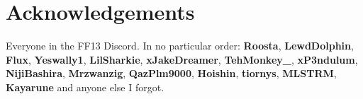 \documentclass[dvipsnames]{report}
\begin{document}
\newcommand{\paradigmdeck}[7]{\begin{tabular}{c|c|cc} #1 \\ \cline{1-3} #2 \\ #3 \\ #4 \\ #5 \\ #6 \\ #7 \\ \end{tabular}}

\newcommand{\paradigmdeckthree}[4]{\begin{tabular}{c|c|cc} #1 \\ \cline{1-3} #2 \\ #3 \\ #4 \\ \end{tabular}}

\newcommand{\paradigmdeckfour}[5]{\begin{tabular}{c|c|cc} #1 \\ \cline{1-3} #2 \\ #3 \\ #4 \\ #5 \\  \end{tabular}}

\newcommand{\paradigmdeckfive}[6]{\begin{tabular}{c|c|cc} #1 \\ \cline{1-3} #2 \\ #3 \\ #4 \\ #5 \\ #6 \\ \end{tabular}}

\newcommand{\save}[1]{Save prompt after cut-scene \##1}

\newcommand{\pickup}[2]{Pick up the \textbf{#1} located #2.}

\newcommand{\itemdrop}[2]{#1\% chance of a \textbf{#2}}

\newcommand{\decep}[2]{\textbf{Deceptisol} on the #1, cancel on the #2.}

\setlength{\columnsep}{.5cm}

\section*{Acknowledgements}
Everyone in the FF13 Discord. In no particular order: \textbf{Roosta}, \textbf{LewdDolphin}, \textbf{Flux}, \textbf{Yeswally1}, \textbf{LilSharkie}, \textbf{xJakeDreamer}, \textbf{TehMonkey\_},  \textbf{xP3ndulum},  \textbf{NijiBashira}, \textbf{Mrzwanzig}, \textbf{QazPlm9000}, \textbf{Hoishin}, \textbf{tiornys}, \textbf{MLSTRM}, \textbf{Kayarune} and anyone else I forgot.
\end{document}
